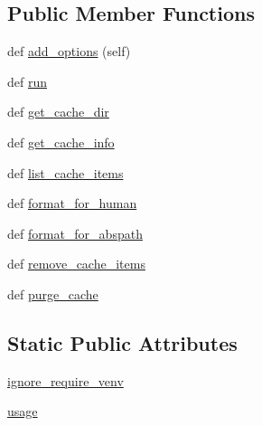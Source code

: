 \subsection*{Public Member Functions}
\begin{DoxyCompactItemize}
\item 
def \hyperlink{classpip_1_1__internal_1_1commands_1_1cache_1_1CacheCommand_a0e754ef44c08dcd4f8b45fce1341c569}{add\+\_\+options} (self)
\item 
def \hyperlink{classpip_1_1__internal_1_1commands_1_1cache_1_1CacheCommand_a42cc46f97ae14dc4b3c7e1a6038afb5f}{run}
\item 
def \hyperlink{classpip_1_1__internal_1_1commands_1_1cache_1_1CacheCommand_a61d326144bb921c7acd94f0f25480181}{get\+\_\+cache\+\_\+dir}
\item 
def \hyperlink{classpip_1_1__internal_1_1commands_1_1cache_1_1CacheCommand_ad502249ec2a882eeeffc8c21e398f80e}{get\+\_\+cache\+\_\+info}
\item 
def \hyperlink{classpip_1_1__internal_1_1commands_1_1cache_1_1CacheCommand_a938f105a41f58ea5e9a18c7d86808a29}{list\+\_\+cache\+\_\+items}
\item 
def \hyperlink{classpip_1_1__internal_1_1commands_1_1cache_1_1CacheCommand_a66a2c6ae8c5a07cd298a6d649ea89f97}{format\+\_\+for\+\_\+human}
\item 
def \hyperlink{classpip_1_1__internal_1_1commands_1_1cache_1_1CacheCommand_add5ea5a3cc58a66dfbdd5d82dcd177a5}{format\+\_\+for\+\_\+abspath}
\item 
def \hyperlink{classpip_1_1__internal_1_1commands_1_1cache_1_1CacheCommand_a8c36cd361c73f9e6df4967713a1e38b0}{remove\+\_\+cache\+\_\+items}
\item 
def \hyperlink{classpip_1_1__internal_1_1commands_1_1cache_1_1CacheCommand_ad80d0a30bbaee962ffda3221abf84940}{purge\+\_\+cache}
\end{DoxyCompactItemize}
\subsection*{Static Public Attributes}
\begin{DoxyCompactItemize}
\item 
\hyperlink{classpip_1_1__internal_1_1commands_1_1cache_1_1CacheCommand_ad9016177e2f0b636652148872e77645f}{ignore\+\_\+require\+\_\+venv}
\item 
\hyperlink{classpip_1_1__internal_1_1commands_1_1cache_1_1CacheCommand_a4548374c4fe31bf1971bd7d769c720a8}{usage}
\end{DoxyCompactItemize}
